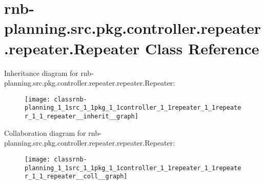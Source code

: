 \hypertarget{classrnb-planning_1_1src_1_1pkg_1_1controller_1_1repeater_1_1repeater_1_1_repeater}{}\section{rnb-\/planning.src.\+pkg.\+controller.\+repeater.\+repeater.\+Repeater Class Reference}
\label{classrnb-planning_1_1src_1_1pkg_1_1controller_1_1repeater_1_1repeater_1_1_repeater}


Inheritance diagram for rnb-\/planning.src.\+pkg.\+controller.\+repeater.\+repeater.\+Repeater\+:
\nopagebreak
\begin{figure}[H]
\begin{center}
\leavevmode
\texttt{[image: classrnb-planning\_1\_1src\_1\_1pkg\_1\_1controller\_1\_1repeater\_1\_1repeater\_1\_1\_repeater\_\_inherit\_\_graph]}
\end{center}
\end{figure}


Collaboration diagram for rnb-\/planning.src.\+pkg.\+controller.\+repeater.\+repeater.\+Repeater\+:
\nopagebreak
\begin{figure}[H]
\begin{center}
\leavevmode
\texttt{[image: classrnb-planning\_1\_1src\_1\_1pkg\_1\_1controller\_1\_1repeater\_1\_1repeater\_1\_1\_repeater\_\_coll\_\_graph]}
\end{center}
\end{figure}
